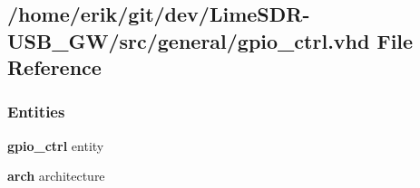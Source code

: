 \subsection{/home/erik/git/dev/\+Lime\+S\+D\+R-\/\+U\+S\+B\+\_\+\+G\+W/src/general/gpio\+\_\+ctrl.vhd File Reference}
\label{gpio__ctrl_8vhd}
\subsubsection*{Entities}
\begin{DoxyCompactItemize}
\item 
{\bf gpio\+\_\+ctrl} entity
\item 
{\bf arch} architecture
\end{DoxyCompactItemize}
